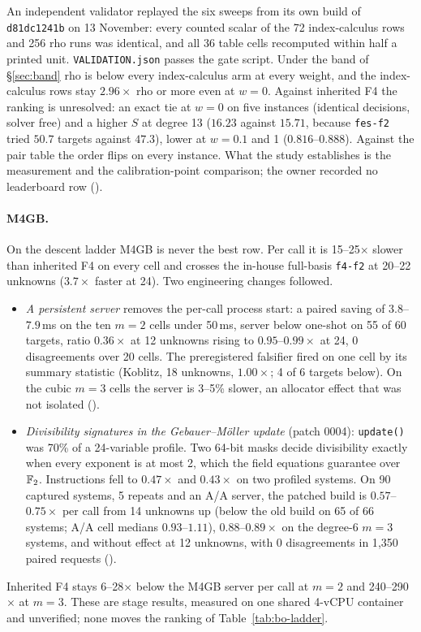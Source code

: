 \noindent An independent validator replayed the six sweeps from its own
build of \texttt{d81dc1241b} on 13 November: every counted scalar of the 72
index-calculus rows and 256 rho runs was identical, and all 36 table cells
recomputed within half a printed unit. \texttt{VALIDATION.json} passes
the gate script. Under the band of \S\ref{sec:band} rho is below every
index-calculus arm at every weight, and the index-calculus rows stay
$2.96\times$ rho or more even at $w=0$. Against inherited F4 the ranking is
unresolved: an exact tie at $w=0$ on five instances (identical decisions,
solver free) and a higher $S$ at degree 13 ($16.23$ against $15.71$, because
\texttt{fes-f2} tried $50.7$ targets against $47.3$), lower at $w=0.1$ and 1
($0.816$--$0.888$). Against the pair table the order flips on every
instance. What the study establishes is the measurement and the
calibration-point comparison; the owner recorded no leaderboard row
().

\paragraph{M4GB.} On the descent ladder M4GB is never the best row. Per
call it is 15--25$\times$ slower than inherited F4 on every cell and crosses
the in-house full-basis \texttt{f4-f2} at 20--22 unknowns ($3.7\times$
faster at 24). Two engineering changes followed.
\begin{itemize}
\item \emph{A persistent server} removes the per-call process start: a
  paired saving of $3.8$--$7.9$\,ms on the ten $m=2$ cells under 50\,ms,
  server below one-shot on 55 of 60 targets, ratio $0.36\times$ at 12
  unknowns rising to $0.95$--$0.99\times$ at 24, 0 disagreements over 20
  cells. The preregistered falsifier fired on one cell by its summary
  statistic (Koblitz, 18 unknowns, $1.00\times$; 4 of 6 targets below). On
  the cubic $m=3$ cells the server is 3--5\% slower, an allocator effect
  that was not isolated
  ().
\item \emph{Divisibility signatures in the Gebauer--M\"oller update}
  (patch 0004): \texttt{update()} was 70\% of a 24-variable profile.
  Two 64-bit masks decide divisibility exactly when every exponent is at
  most 2, which the field equations guarantee over $\mathbb{F}_2$. Instructions
  fell to $0.47\times$ and $0.43\times$ on two profiled systems. On 90
  captured systems, 5 repeats and an A/A server, the patched build is
  $0.57$--$0.75\times$ per call from 14 unknowns up (below the old build on
  65 of 66 systems; A/A cell medians $0.93$--$1.11$), $0.88$--$0.89\times$ on
  the degree-6 $m=3$ systems, and without effect at 12 unknowns, with 0
  disagreements in 1{,}350 paired requests
  ().
\end{itemize}
Inherited F4 stays 6--28$\times$ below the M4GB server per call at $m=2$ and
240--290$\times$ at $m=3$. These are stage results, measured on one shared
4-vCPU container and unverified; none moves the ranking of
Table~\ref{tab:bo-ladder}.

